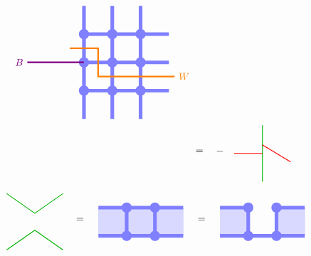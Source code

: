 \documentclass[report,paper=a4, fontsize=12pt, line_length=16cm, number_of_lines=33,dvipdfmx]{jlreq}
\numberwithin{equation}{chapter}
\begin{document}
\begin{align}
\begin{tikzpicture}[baseline=0cm]
        \foreach \x in {0,1,2}{
            \foreach \y in {-1,0,1}{
                \fill[linkblue] (\x,\y) circle (1.8mm);
            }
        }
        \foreach \x in {0,1,2}{
            \foreach \y in {-1,0,1}{
                \draw[linkblue, line width = 1.3mm](\x,\y)--(\x + 1,\y);
            }
        }
        \foreach \x in {0,1,2}{
            \foreach \y in {-2,-1,...,1}{
                \draw[linkblue, line width = 1.3mm](\x,\y)--(\x,\y + 1);
            }
        }
        \draw[red!50!yellow, ultra thick](-0.5, 0.5)--(0.5, 0.5)--(0.5,-0.5)--(3.2,-0.5) node[right]{$W$};
        \draw[red!50!blue, ultra thick](0,0)--(-2,0) node[left]{$B$};
    \end{tikzpicture}
    \notag \\
    &=\quad -\quad
    \begin{tikzpicture}[baseline=0]
        \draw[darkgreen,thick] (0,1)--(0,-1);
        \draw[red,thick] (-1,0)--(0,0);
        \draw[red,thick] (1,-0.3)--(0,0.3);
    \end{tikzpicture}
\end{align}


\begin{align}
    \begin{tikzpicture}[baseline=0]
        \coordinate(A) at (-1,-1);
        \coordinate(B) at (1,-1);
        \coordinate(C) at (1,1);
        \coordinate(D) at (-1,1);
        \draw[darkgreen,thick] (D)--(0,0.3)--(C);
        \draw[darkgreen,thick] (A)--(0,-0.3)--(B);
    \end{tikzpicture}
    \quad=\quad 
    \begin{tikzpicture}[baseline=0.5cm]
        \foreach \x in {0,1,2}{
            \foreach \y in {-2,-1,...,1}{
            \fill[plaqblue](\x,0) rectangle (\x+1,1);
            }
        }
        \foreach \x in {1,2}{
            \foreach \y in {0,1}{
                \fill[linkblue] (\x,\y) circle (1.8mm);
            }
        }
        \foreach \x/\y in {0/0,1/0,2/0,0/1,1/1,2/1}{
                \draw[linkblue, line width = 1.3mm](\x,\y)--(\x + 1,\y);
        }
        \foreach \x in {1,2}{
            \draw[linkblue, line width = 1.3mm](\x,0)--(\x, 1);
        }
    \end{tikzpicture}
    \quad=\quad 
    \begin{tikzpicture}[baseline=0.5cm]
        \foreach \x in {0,2}{
            \foreach \y in {-2,-1,...,1}{
            \fill[plaqblue](\x,0) rectangle (\x+1,1);
            }
        }
        \foreach \x in {1,2}{
            \foreach \y in {0,1}{
                \fill[linkblue] (\x,\y) circle (1.8mm);
            }
        }
        \foreach \x/\y in {0/0,1/0,2/0,0/1,2/1}{
                \draw[linkblue, line width = 1.3mm](\x,\y)--(\x + 1,\y);
        }
        \foreach \x in {1,2}{
            \draw[linkblue, line width = 1.3mm](\x,0)--(\x, 1);
        }
    \end{tikzpicture}   
\end{align}
\end{document}
